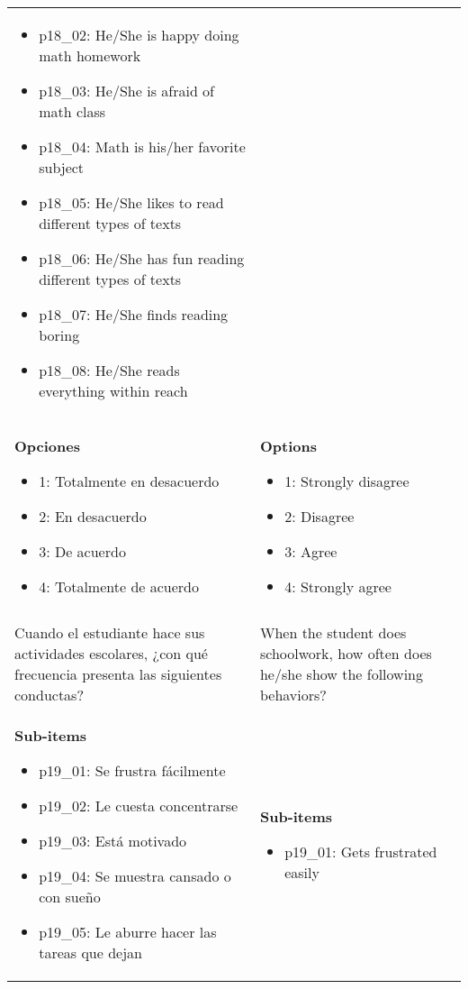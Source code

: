 \documentclass[11pt]{article}
\begin{document}
\begin{longtable}{@{}LL@{}}
\begin{itemize}[leftmargin=*]
\item p18\_02: He/She is happy doing math homework
\item p18\_03: He/She is afraid of math class
\item p18\_04: Math is his/her favorite subject
\item p18\_05: He/She likes to read different types of texts
\item p18\_06: He/She has fun reading different types of texts
\item p18\_07: He/She finds reading boring
\item p18\_08: He/She reads everything within reach\end{itemize} \\
\textbf{Opciones}\par\begin{itemize}[leftmargin=*]\item 1: Totalmente en desacuerdo
\item 2: En desacuerdo
\item 3: De acuerdo
\item 4: Totalmente de acuerdo\end{itemize} & \textbf{Options}\par\begin{itemize}[leftmargin=*]\item 1: Strongly disagree
\item 2: Disagree
\item 3: Agree
\item 4: Strongly agree\end{itemize} \\
\addlinespace[4pt]
 \\ 
Cuando el estudiante hace sus actividades escolares, ¿con qué frecuencia presenta las siguientes conductas? & When the student does schoolwork, how often does he/she show the following behaviors? \\
\textbf{Sub-items}\par\begin{itemize}[leftmargin=*]\item p19\_01: Se frustra fácilmente
\item p19\_02: Le cuesta concentrarse
\item p19\_03: Está motivado
\item p19\_04: Se muestra cansado o con sueño
\item p19\_05: Le aburre hacer las tareas que dejan\end{itemize} & \textbf{Sub-items}\par\begin{itemize}[leftmargin=*]\item p19\_01: Gets frustrated easily

\end{itemize}
\end{longtable}
\end{document}
